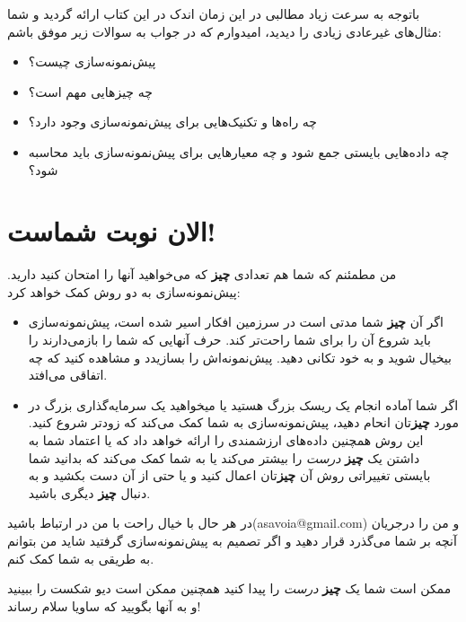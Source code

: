 باتوجه به سرعت زیاد مطالبی در این زمان اندک در این کتاب ارائه گردید و
شما مثال‌های غیرعادی زیادی را دیدید، امیدوارم که در جواب به سوالات زیر
موفق باشم:

\begin{itemize}

\item
  پیش‌نمونه‌سازی چیست؟
\item
  چه چیزهایی مهم است؟
\item
  چه راه‌ها و تکنیک‌هایی برای پیش‌نمونه‌سازی وجود دارد؟
\item
  چه داده‌هایی بایستی جمع شود و چه معیارهایی برای پیش‌نمونه‌سازی باید
  محاسبه شود؟
\end{itemize}

\section{الان نوبت
شماست!}\label{ux627ux644ux627ux646-ux646ux648ux628ux62a-ux634ux645ux627ux633ux62a}

من مطمئنم که شما هم تعدادی \textbf{چیز} که می‌خواهید آنها را امتحان کنید
دارید. پیش‌نمونه‌سازی به دو روش کمک خواهد کرد:

\begin{itemize}

\item
  اگر آن \textbf{چیز} شما مدتی است در سرزمین افکار اسیر شده است،
  پیش‌نمونه‌سازی باید شروع آن را برای شما راحت‌تر کند. حرف آنهایی که شما
  را بازمی‌دارند را بیخیال شوید و به خود تکانی دهید. پیش‌نمونه‌اش را
  بسازیدد و مشاهده کنید که چه اتفاقی می‌افتد.
\item
  اگر شما آماده انجام یک ریسک بزرگ هستید یا میخواهید یک سرمایه‌گذاری
  بزرگ در مورد \textbf{چیز}تان انحام دهید، پیش‌نمونه‌سازی به شما کمک
  می‌کند که زودتر شروع کنید. این روش همچنین داده‌های ارزشمندی را ارائه
  خواهد داد که یا اعتماد شما به داشتن یک \textbf{چیز} \emph{درست} را
  بیشتر می‌کند یا به شما کمک می‌کند که بدانید شما بایستی تغییراتی روش آن
  \textbf{چیز}تان اعمال کنید و یا حتی از آن دست بکشید و به دنبال
  \textbf{چیز} دیگری باشید.
\end{itemize}

در هر حال با خیال راحت با من در ارتباط باشید(asavoia@gmail.com) و من را
درجریان آنچه بر شما می‌گذرد قرار دهید و اگر تصمیم به پیش‌نمونه‌سازی
گرفتید شاید من بتوانم به طریقی به شما کمک کنم.

ممکن است شما یک \textbf{چیز} \emph{درست} را پیدا کنید همچنین ممکن است
دیو شکست را ببینید و به آنها بگویید که ساویا سلام رساند!

